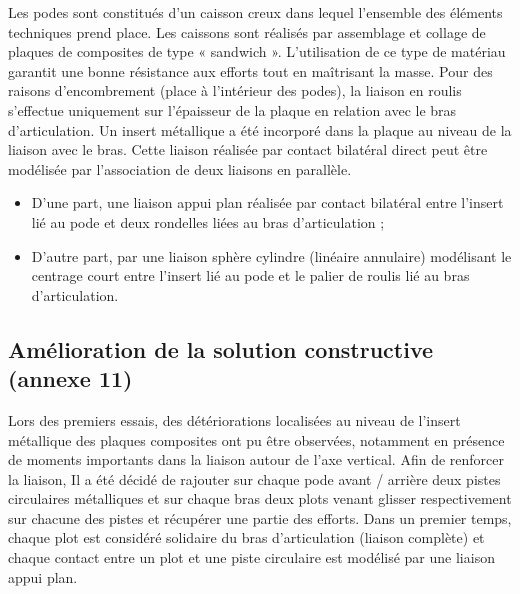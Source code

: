 Les podes sont constitués d’un caisson creux dans lequel l’ensemble des éléments techniques prend place. Les caissons sont réalisés par assemblage et collage de plaques de composites de type « sandwich ». L’utilisation de ce
type de matériau garantit une bonne résistance aux efforts tout en maîtrisant la masse.
Pour des raisons d’encombrement (place à l’intérieur des podes), la liaison en roulis s’effectue uniquement sur l’épaisseur de la plaque en relation avec le bras d’articulation. Un insert métallique a été incorporé dans la plaque au niveau de la liaison avec le bras. Cette liaison réalisée par contact bilatéral direct peut être modélisée par l’association de deux liaisons en parallèle.
\begin{itemize}
\item D’une part, une liaison appui plan réalisée par contact bilatéral entre l’insert lié au pode et deux rondelles liées
au bras d’articulation ;
\item D’autre part, par une liaison sphère cylindre (linéaire annulaire) modélisant le centrage court entre l’insert lié
au pode et le palier de roulis lié au bras d’articulation.
\end{itemize}

\ifprof
\begin{corrige}
\end{corrige}
\else
\fi



\subsection{Amélioration de la solution constructive (annexe 11)}

Lors des premiers essais, des détériorations localisées au niveau de l’insert métallique des plaques composites ont pu être observées, notamment en présence de moments importants dans la liaison autour de l’axe vertical. Afin de
renforcer la liaison, Il a été décidé de rajouter sur chaque pode avant / arrière deux pistes circulaires métalliques et sur chaque bras deux plots venant glisser respectivement sur chacune des pistes et récupérer une partie des efforts.
Dans un premier temps, chaque plot est considéré solidaire du bras d’articulation (liaison complète) et chaque contact entre un plot et une piste circulaire est modélisé par une liaison appui plan.

\ifprof
\begin{corrige}
\end{corrige}
\else
\fi

	
